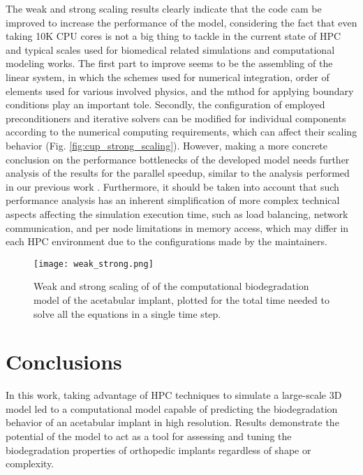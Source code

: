 The weak and strong scaling results clearly indicate that the code cam be improved to increase the performance of the model, considering the fact that even taking 10K CPU cores is not a big thing to tackle in the current state of HPC and typical scales used for biomedical related simulations and computational modeling works. The first part to improve seems to be the assembling of the linear system, in which the schemes used for numerical integration, order of elements used for various involved physics, and the mthod for applying boundary conditions play an important tole. Secondly, the configuration of employed preconditioners and iterative solvers can be modified for individual components according to the numerical computing requirements, which can affect their scaling behavior (Fig. \ref{fig:cup_strong_scaling}). However, making a more concrete conclusion on the performance bottlenecks of the developed model needs further analysis of the results for the parallel speedup, similar to the analysis performed in our previous work \cite{Barzegari2022}. Furthermore, it should be taken into account that such performance analysis has an inherent simplification of more complex technical aspects affecting the simulation execution time, such as load balancing, network communication, and per node limitations in memory access, which may differ in each HPC environment due to the configurations made by the maintainers.


\begin{figure}[h]
\centering
\medskip
\texttt{[image: weak\_strong.png]}
\caption[Weak and strong scaling of of the acetabular implant model]{Weak and strong scaling of of the computational biodegradation model of the acetabular implant, plotted for the total time needed to solve all the equations in a single time step.} \label{fig:cup_weak_strong}
\end{figure}


\section{Conclusions}

In this work, taking advantage of HPC techniques to simulate a large-scale 3D model led to a computational model capable of predicting the biodegradation behavior of an acetabular implant in high resolution. Results demonstrate the potential of the model to act as a tool for assessing and tuning the biodegradation properties of orthopedic  implants regardless of shape or complexity.


